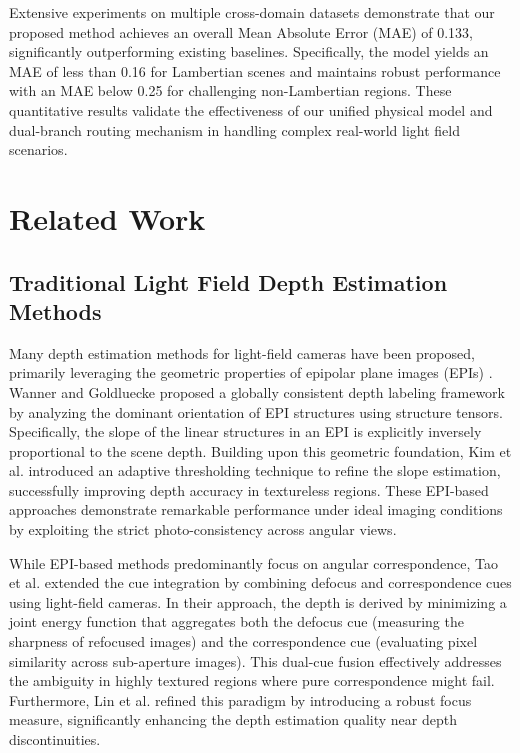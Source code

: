 \documentclass[lettersize,journal]{IEEEtran}
\begin{document}
Extensive experiments on multiple cross-domain datasets demonstrate that our proposed method achieves an overall Mean Absolute Error (MAE) of 0.133, significantly outperforming existing baselines. Specifically, the model yields an MAE of less than 0.16 for Lambertian scenes and maintains robust performance with an MAE below 0.25 for challenging non-Lambertian regions. These quantitative results validate the effectiveness of our unified physical model and dual-branch routing mechanism in handling complex real-world light field scenarios.

\section{Related Work}

\subsection{Traditional Light Field Depth Estimation Methods}

Many depth estimation methods for light-field cameras have been proposed, primarily leveraging the geometric properties of epipolar plane images (EPIs) \cite{epipolar_plane_image,light_field_depth_estimation}. Wanner and Goldluecke \cite{Wanner,Goldluecke} proposed a globally consistent depth labeling framework by analyzing the dominant orientation of EPI structures using structure tensors. Specifically, the slope of the linear structures in an EPI is explicitly inversely proportional to the scene depth. Building upon this geometric foundation, Kim et al. \cite{Kim,EPI} introduced an adaptive thresholding technique to refine the slope estimation, successfully improving depth accuracy in textureless regions. These EPI-based approaches demonstrate remarkable performance under ideal imaging conditions by exploiting the strict photo-consistency across angular views.

While EPI-based methods predominantly focus on angular correspondence, Tao et al. \cite{Tao,defocus_and_correspondence} extended the cue integration by combining defocus and correspondence cues using light-field cameras. In their approach, the depth is derived by minimizing a joint energy function that aggregates both the defocus cue (measuring the sharpness of refocused images) and the correspondence cue (evaluating pixel similarity across sub-aperture images). This dual-cue fusion effectively addresses the ambiguity in highly textured regions where pure correspondence might fail. Furthermore, Lin et al. \cite{Lin,defocus} refined this paradigm by introducing a robust focus measure, significantly enhancing the depth estimation quality near depth discontinuities.
\end{document}
